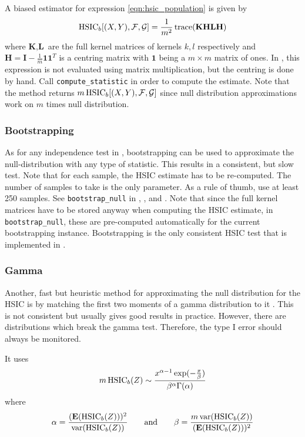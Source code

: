 A biased estimator for expression \ref{eqn:hsic_population} is given by
\begin{align*}
\operatorname{HSIC}_b[(X,Y),\mathcal{F},\mathcal{G}]=\frac{1}{m^2}\operatorname{trace}(\textbf{KHLH})
\end{align*}
where $\textbf{K}, \textbf{L}$ are the full kernel matrices of kernels $k, l$ respectively and $\textbf{H}=\textbf{I}-\frac{1}{m}\textbf{1}\textbf{1}^T$ is a centring matrix with $\textbf{1}$ being a $m\times m$ matrix of ones. In \shogun{}, this expression is not evaluated using matrix multiplication, but the centring is done by hand. Call \texttt{compute\_statistic} in order to compute the estimate. Note that the method returns $m\operatorname{HSIC}_b[(X,Y),\mathcal{F},\mathcal{G}]$ since null distribution approximations work on $m$ times null distribution.

\subsubsection{Bootstrapping}
As for any independence test in \shogun{}, bootstrapping can be used to approximate the null-distribution with any type of statistic. This results in a consistent, but slow test. Note that for each sample, the HSIC estimate has to be re-computed. The number of samples to take is the only parameter. As a rule of thumb, use at least 250 samples.
See \texttt{bootstrap\_null} in , , and . Note that since the full kernel matrices have to be stored anyway when computing the HSIC estimate, in \texttt{bootstrap\_null}, these are pre-computed automatically for the current bootstrapping instance.
Bootstrapping is the only consistent HSIC test that is implemented in \shogun{}.

\subsubsection{Gamma}
Another, fast but heuristic method for approximating the null distribution for the HSIC is by matching the first two moments of a gamma distribution to it \citep[Equation 9]{Gretton2008d}. This is not consistent but usually gives good results in practice. However, there are distributions which break the gamma test. Therefore, the type I error should always be monitored.

It uses
\begin{align}
\label{eqn:hsic_gamma}
m\operatorname{HSIC}_b(Z) \sim \frac{x^{\alpha-1}\exp(-\frac{x}{\beta})}{\beta^\alpha \Gamma(\alpha)}
\end{align}
where
\begin{align*}
\alpha=\frac{(\textbf{E}(\operatorname{HSIC}_b(Z)))^2}{\operatorname{var}(\operatorname{HSIC}_b(Z))} \qquad \text{and} \qquad
 \beta=\frac{m \operatorname{var}(\operatorname{HSIC}_b(Z))}{(\textbf{E}(\operatorname{HSIC}_b(Z)))^2}
\end{align*}

